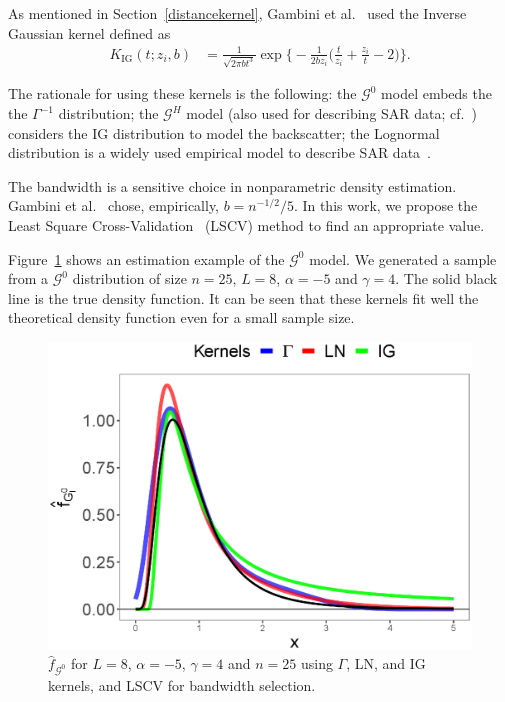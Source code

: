 \documentclass[twocolumn]{svjour3}
\begin{document}
As mentioned in Section~\ref{distancekernel}, Gambini et al.~\cite{gambini2015} used the Inverse Gaussian kernel defined as
\begin{align}
K_{\text{IG}}( t; z_i,b) & =\frac{1}{\sqrt{2\pi b t^3}} 
\exp\Big\{-\frac{1}{2b z_i} \Big(\frac{t}{z_i}+\frac{z_i}{t}-2\Big)\Big\}.
\end{align}

The rationale for using these kernels is the following:
the $\mathcal{G}^0$ model embeds the the $\Gamma^{-1}$ distribution;
the $\mathcal{G}^H$ model (also used for describing SAR data; cf.~\cite{PolarimetricSegmentationBSplinesMSSP}) considers the IG distribution to model the backscatter;
the Lognormal distribution is a widely used empirical model to describe SAR data~\cite{Gao2010}. 

The bandwidth is a sensitive choice in nonparametric density estimation. 
Gambini et al.~\cite{gambini2015} chose, empirically, $b=n^{-1/2}/5$. 
In this work, we propose the Least Square Cross-Validation~\cite{Wu1997} (LSCV) method to find an appropriate value.

Figure~\ref{EstimacionLNyGAyIG} shows an estimation example of the $\mathcal{G}^0$ model. 
We generated a sample from a $\mathcal{G}^0$ distribution of size $n=25$, $L = 8$, $\alpha=-5$ and $\gamma=4$. 
The solid black line is the true density function. 
It can be seen that these kernels fit well the theoretical density function even for a small sample size.

\begin{figure}[hbt]
	\centering
	\includegraphics[scale=0.35]{../../../Figures/PaperTesis/NucleosGALNyIG.eps}
	\caption{\label{EstimacionLNyGAyIG} $\widehat{f}_{\mathcal{G}^0}$ for $L=8$, $\alpha=-5$, $\gamma=4$ and $n=25$ using $\Gamma$, LN, and IG kernels, and LSCV for bandwidth selection.}
\end{figure}
\end{document}
